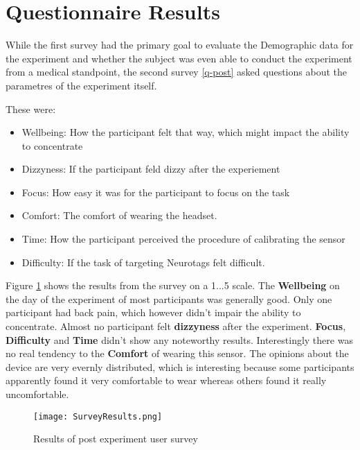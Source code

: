         \section{Questionnaire Results}

            While the first survey had the primary goal to evaluate the Demographic data for the experiment and whether the subject was even able to conduct the experiment from a medical standpoint, the second survey \ref*{q-post} asked questions about the parametres of the experiment itself.

            These were:

            \begin{itemize}
                \item Wellbeing: How the participant felt that way, which might impact the ability to concentrate
                \item Dizzyness: If the participant feld dizzy after the experiement
                \item Focus: How easy it was for the participant to focus on the task
                \item Comfort: The comfort of wearing the headset.
                \item Time: How the participant perceived the procedure of calibrating the sensor 
                \item Difficulty: If the task of targeting Neurotags felt difficult.
            \end{itemize}

            Figure \ref*{survey-boxplots} shows the results from the survey on a 1...5 scale. The \textbf{Wellbeing} on the day of the experiment of most participants was generally good. Only one participant had back pain, which however didn't impair the ability to concentrate. Almost no participant felt \textbf{dizzyness} after the experiment. \textbf{Focus}, \textbf{Difficulty} and \textbf{Time} didn't show any noteworthy results. Interestingly there was no real tendency to the \textbf{Comfort} of wearing this sensor. The opinions about the device are very evernly distributed, which is interesting because some participants apparently found it very comfortable to wear whereas others found it really uncomfortable.

            \begin{figure}[h]     %
                \centering
                \texttt{[image: SurveyResults.png]} 
                \caption{Results of post experiment user survey}\label{survey-boxplots}
            \end{figure} 

